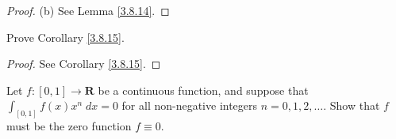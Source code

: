 \begin{proof}{(b)}
    See Lemma \ref{3.8.14}.
\end{proof}

\begin{exercise}\label{ex 3.8.7}
    Prove Corollary \ref{3.8.15}.
\end{exercise}

\begin{proof}
    See Corollary \ref{3.8.15}.
\end{proof}

\begin{exercise}\label{ex 3.8.8}
    Let \(f : [0, 1] \to \mathbf{R}\) be a continuous function, and suppose that \(\int_{[0, 1]} f(x) x^n \; dx = 0\) for all non-negative integers \(n = 0, 1, 2, \dots\).
    Show that \(f\) must be the zero function \(f \equiv 0\).
\end{exercise}

